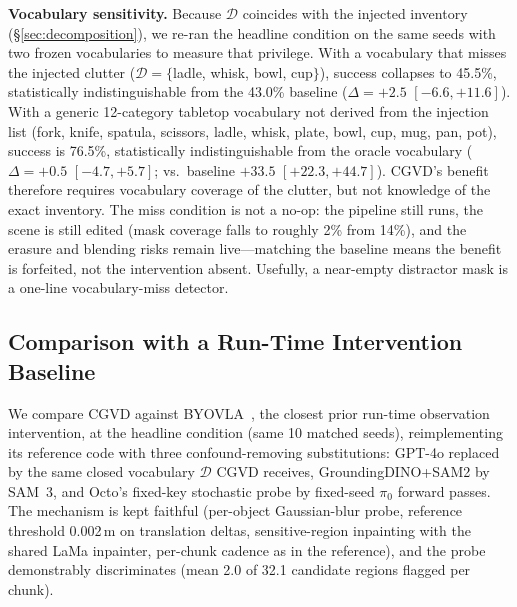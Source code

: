 \documentclass[letterpaper, 10 pt, conference]{ieeeconf}  %
\begin{document}
\textbf{Vocabulary sensitivity.} Because $\mathcal{D}$ coincides with the injected inventory (\S\ref{sec:decomposition}), we re-ran the headline condition on the same seeds with two frozen vocabularies to measure that privilege. With a vocabulary that misses the injected clutter ($\mathcal{D} = \{$ladle, whisk, bowl, cup$\}$), success collapses to 45.5\%, statistically indistinguishable from the 43.0\% baseline ($\Delta = +2.5$ $[-6.6, +11.6]$). With a generic 12-category tabletop vocabulary not derived from the injection list (fork, knife, spatula, scissors, ladle, whisk, plate, bowl, cup, mug, pan, pot), success is 76.5\%, statistically indistinguishable from the oracle vocabulary ($\Delta = +0.5$ $[-4.7, +5.7]$; vs.\ baseline $+33.5$ $[+22.3, +44.7]$). CGVD's benefit therefore requires vocabulary coverage of the clutter, but not knowledge of the exact inventory. The miss condition is not a no-op: the pipeline still runs, the scene is still edited (mask coverage falls to roughly 2\% from 14\%), and the erasure and blending risks remain live---matching the baseline means the benefit is forfeited, not the intervention absent. Usefully, a near-empty distractor mask is a one-line vocabulary-miss detector.



\subsection{Comparison with a Run-Time Intervention Baseline}
\label{sec:byovla}
We compare CGVD against BYOVLA~\cite{byovla}, the closest prior run-time observation intervention, at the headline condition (same 10 matched seeds), reimplementing its reference code with three confound-removing substitutions: GPT-4o replaced by the same closed vocabulary $\mathcal{D}$ CGVD receives, GroundingDINO+SAM2 by SAM~3, and Octo's fixed-key stochastic probe by fixed-seed $\pi_0$ forward passes. The mechanism is kept faithful (per-object Gaussian-blur probe, reference threshold 0.002\,m on translation deltas, sensitive-region inpainting with the shared LaMa inpainter, per-chunk cadence as in the reference), and the probe demonstrably discriminates (mean 2.0 of 32.1 candidate regions flagged per chunk).
\end{document}
